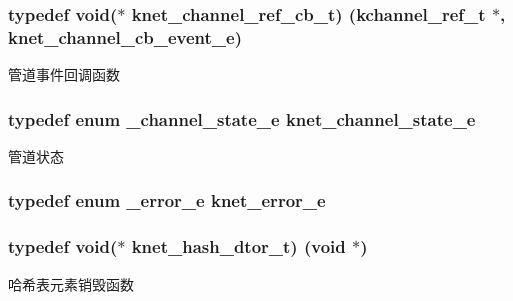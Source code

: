 \subsubsection[{knet\+\_\+channel\+\_\+ref\+\_\+cb\+\_\+t}]{\setlength{\rightskip}{0pt plus 5cm}typedef void($\ast$ knet\+\_\+channel\+\_\+ref\+\_\+cb\+\_\+t) ({\bf kchannel\+\_\+ref\+\_\+t} $\ast$, {\bf knet\+\_\+channel\+\_\+cb\+\_\+event\+\_\+e})}\label{a00066_a8a7d96123ef4565c6d08fe58a10476a9_a8a7d96123ef4565c6d08fe58a10476a9}
管道事件回调函数 \hypertarget{a00066_a74ff83eaafca5c7093accdc65c6b0646_a74ff83eaafca5c7093accdc65c6b0646}{}
\subsubsection[{knet\+\_\+channel\+\_\+state\+\_\+e}]{\setlength{\rightskip}{0pt plus 5cm}typedef enum {\bf \+\_\+channel\+\_\+state\+\_\+e}  {\bf knet\+\_\+channel\+\_\+state\+\_\+e}}\label{a00066_a74ff83eaafca5c7093accdc65c6b0646_a74ff83eaafca5c7093accdc65c6b0646}
管道状态 \hypertarget{a00066_abc9a047a9545c201adf70e4793ed0689_abc9a047a9545c201adf70e4793ed0689}{}
\subsubsection[{knet\+\_\+error\+\_\+e}]{\setlength{\rightskip}{0pt plus 5cm}typedef enum {\bf \+\_\+error\+\_\+e}  {\bf knet\+\_\+error\+\_\+e}}\label{a00066_abc9a047a9545c201adf70e4793ed0689_abc9a047a9545c201adf70e4793ed0689}
\hypertarget{a00066_af806592520383146be2f3aac316beb45_af806592520383146be2f3aac316beb45}{}
\subsubsection[{knet\+\_\+hash\+\_\+dtor\+\_\+t}]{\setlength{\rightskip}{0pt plus 5cm}typedef void($\ast$ knet\+\_\+hash\+\_\+dtor\+\_\+t) (void $\ast$)}\label{a00066_af806592520383146be2f3aac316beb45_af806592520383146be2f3aac316beb45}
哈希表元素销毁函数 \hypertarget{a00066_a8bb61ec2ff976625d0707a81c1ccc149_a8bb61ec2ff976625d0707a81c1ccc149}{}
